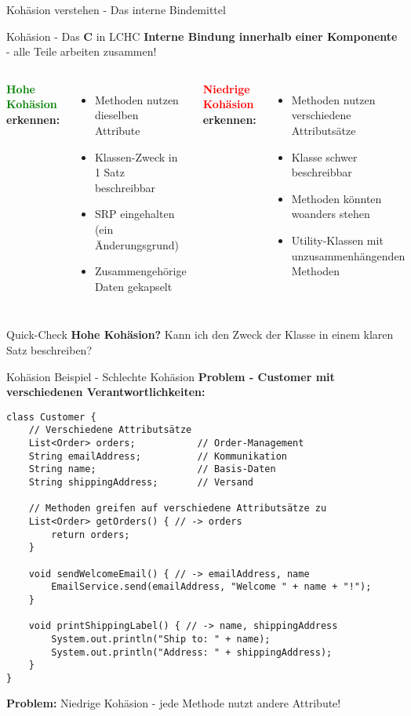 \begin{frame}{Kohäsion verstehen - Das interne Bindemittel}
  \begin{exampleblock}{Kohäsion - Das \textbf{C} in LCHC}
    \textbf{Interne Bindung innerhalb einer Komponente} - alle Teile arbeiten zusammen!
  \end{exampleblock}

  \begin{columns}[T]
    \textbf{\textcolor{green}{Hohe Kohäsion} erkennen:}
    \begin{itemize}
      \item Methoden nutzen dieselben Attribute
      \item Klassen-Zweck in 1 Satz beschreibbar
      \item SRP eingehalten (ein Änderungsgrund)
      \item Zusammengehörige Daten gekapselt
    \end{itemize}

    \textbf{\textcolor{red}{Niedrige Kohäsion} erkennen:}
    \begin{itemize}
      \item Methoden nutzen verschiedene Attributsätze
      \item Klasse schwer beschreibbar
      \item Methoden könnten woanders stehen
      \item Utility-Klassen mit unzusammenhängenden Methoden
    \end{itemize}
  \end{columns}

  \begin{alertblock}{Quick-Check}
    \textbf{Hohe Kohäsion?} Kann ich den Zweck der Klasse in einem klaren Satz beschreiben?
  \end{alertblock}
\end{frame}

\begin{frame}[fragile]{Kohäsion Beispiel - Schlechte Kohäsion}
  \textbf{Problem - Customer mit verschiedenen Verantwortlichkeiten:}
  \begin{lstlisting}[style=java, basicstyle=\tiny\ttfamily]
class Customer {
    // Verschiedene Attributsätze
    List<Order> orders;           // Order-Management
    String emailAddress;          // Kommunikation
    String name;                  // Basis-Daten
    String shippingAddress;       // Versand

    // Methoden greifen auf verschiedene Attributsätze zu
    List<Order> getOrders() { // -> orders
        return orders;
    }

    void sendWelcomeEmail() { // -> emailAddress, name
        EmailService.send(emailAddress, "Welcome " + name + "!");
    }

    void printShippingLabel() { // -> name, shippingAddress
        System.out.println("Ship to: " + name);
        System.out.println("Address: " + shippingAddress);
    }
}
  \end{lstlisting}
  \textbf{Problem:} Niedrige Kohäsion - jede Methode nutzt andere Attribute!
\end{frame}

